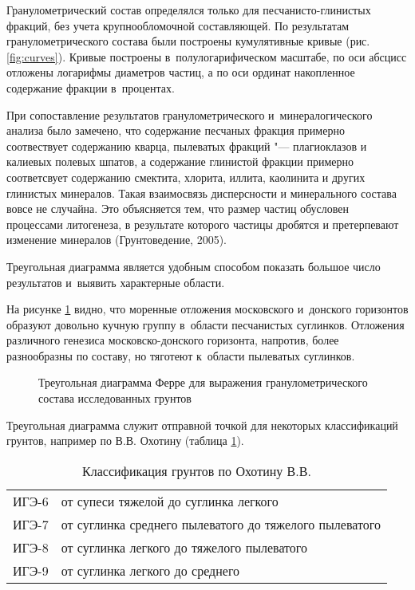 Гранулометрический состав определялся только для песчанисто-глинистых фракций, без учета крупнообломочной составляющей.
По результатам гранулометрического состава были построены кумулятивные кривые (рис. \ref{fig:curves}).
Кривые построены в~полулогарифическом масштабе, 
по оси абсцисс отложены логарифмы диаметров частиц, 
а по оси ординат накопленное содержание фракции в~процентах.

{
\small

}

При сопоставление результатов гранулометрического и~минералогического анализа было замечено, 
что содержание песчаных фракция примерно соотвествует содержанию кварца, пылеватых фракций "--- плагиоклазов и калиевых полевых шпатов, а содержание глинистой фракции примерно соответсвует содержанию смектита, хлорита, иллита, каолинита и других глинистых минералов.
Такая взаимосвязь дисперсности и минерального состава вовсе не случайна. Это объясняется тем, что размер частиц обусловен процессами литогенеза, в результате которого частицы дробятся и претерпевают изменение минералов (Грунтоведение, 2005)\cite{grunt2005}.

Треугольная диаграмма является удобным способом показать большое число результатов и~выявить характерные области.

На рисунке \ref{Fig:Ferre} видно, что моренные отложения московского и~донского горизонтов образуют довольно кучную группу в~области песчанистых суглинков.
Отложения различного генезиса московско-донского горизонта, напротив, более разнообразны по составу, но тяготеют к~области 
пылеватых суглинков.

\begin{figure}[ht]
    \centering
    \small
    
    \caption{Треугольная диаграмма Ферре для выражения гранулометрического состава исследованных грунтов}
    \label{Fig:Ferre}
\end{figure}

Треугольная диаграмма служит отправной точкой для некоторых классификаций грунтов, например по В.\;В. Охотину (таблица \ref{tab:oxot}).

\begin{table}[ht]
    \centering
    \caption{Классификация грунтов по Охотину В.\:В.} \label{tab:oxot}
    \begin{tabular}{cl}
    ИГЭ-6 \dotfill &  от супеси тяжелой до суглинка легкого \\
    ИГЭ-7 \dotfill &  от суглинка среднего пылеватого до тяжелого пылеватого \\
    ИГЭ-8 \dotfill &  от суглинка легкого до тяжелого пылеватого \\
    ИГЭ-9 \dotfill &  от суглинка легкого до среднего \\
    \end{tabular}
\end{table}

